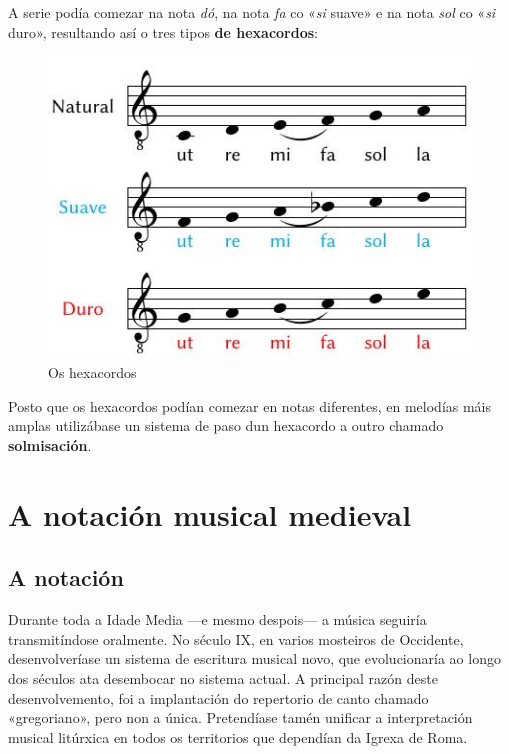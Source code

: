 \documentclass[spanish, a4paper,nobind]{templates/ociamthesis}
\begin{document}
A serie podía comezar na nota \emph{dó}, na nota \emph{fa} co «\emph{si} suave» e na nota \emph{sol} co «\emph{si} duro», resultando así o tres tipos \textbf{de hexacordos}:

\begin{figure}
\centering
\includegraphics{figures/ud-03/hexacordos.jpg}
\caption{Os hexacordos}
\end{figure}

Posto que os hexacordos podían comezar en notas diferentes, en melodías máis amplas utilizábase un sistema de paso dun hexacordo a outro chamado \textbf{solmisación}.

\hypertarget{a-notaciuxf3n-musical-medieval}{%
\section*{A notación musical medieval}\label{a-notaciuxf3n-musical-medieval}}

\hypertarget{a-notaciuxf3n}{%
\subsection*{A notación}\label{a-notaciuxf3n}}

Durante toda a Idade Media ---e mesmo despois--- a música seguiría transmitíndose oralmente. No século IX, en varios mosteiros de Occidente, desenvolveríase un sistema de escritura musical novo, que evolucionaría ao longo dos séculos ata desembocar no sistema actual. A principal razón deste desenvolvemento, foi a implantación do repertorio de canto chamado «gregoriano», pero non a única. Pretendíase tamén unificar a interpretación musical litúrxica en todos os territorios que dependían da Igrexa de Roma.
\end{document}
